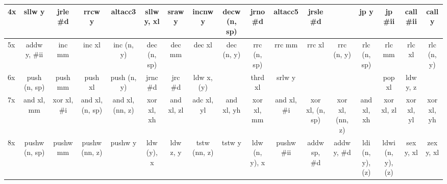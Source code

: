 \documentclass{book}
\begin{document}
\begin{table}
\begin{adjustbox}{width=1.2\textwidth}
\begin{tabular}{l||c|c|c|c|c|c|c|c|c|c|c|c|c|c|c|c}
\hline
4x & \cellcolor{Bisque1} sllw y & \cellcolor{DarkSeaGreen1} jrle \#d & \cellcolor{Bisque1} rrcw y & \cellcolor{DarkSeaGreen1} altacc3 & \cellcolor{Bisque1} sllw y, xl & \cellcolor{Bisque1} sraw y & \cellcolor{Bisque1} incnw y & \cellcolor{Bisque1} decw (n, sp) & \cellcolor{DarkSeaGreen1} jrno \#d & \cellcolor{DarkSeaGreen1} altacc5 & \cellcolor{DarkSeaGreen1} jrsle \#d & \cellcolor{white}  & \cellcolor{DarkSeaGreen1} jp y & \cellcolor{DarkSeaGreen1} jp \#ii & \cellcolor{DarkSeaGreen1} call \#ii & \cellcolor{DarkSeaGreen1} call y \\
\hline
5x & \cellcolor{Bisque1} addw y, \#ii & \cellcolor{DarkSeaGreen1} inc mm & \cellcolor{DarkSeaGreen1} inc xl & \cellcolor{Bisque1} inc (n, y) & \cellcolor{DarkSeaGreen1} dec (n, sp) & \cellcolor{DarkSeaGreen1} dec mm & \cellcolor{DarkSeaGreen1} dec xl & \cellcolor{Bisque1} dec (n, y) & \cellcolor{DarkSeaGreen1} rrc (n, sp) & \cellcolor{DarkSeaGreen1} rrc mm & \cellcolor{DarkSeaGreen1} rrc xl & \cellcolor{Bisque1} rrc (n, y) & \cellcolor{DarkSeaGreen1} rlc (n, sp) & \cellcolor{DarkSeaGreen1} rlc mm & \cellcolor{DarkSeaGreen1} rlc xl & \cellcolor{Bisque1} rlc (n, y) \\
\hline
6x & \cellcolor{DarkSeaGreen1} push (n, sp) & \cellcolor{DarkSeaGreen1} push mm & \cellcolor{DarkSeaGreen1} push xl & \cellcolor{Bisque1} push (n, y) & \cellcolor{DarkSeaGreen1} jrnc \#d & \cellcolor{DarkSeaGreen1} jrc \#d & \cellcolor{Bisque1} ldw x, (y) & \cellcolor{white}  & \cellcolor{DarkSeaGreen1} thrd xl & \cellcolor{Bisque1} srlw y & \cellcolor{white}  & \cellcolor{white}  & \cellcolor{white}  & \cellcolor{DarkSeaGreen1} pop xl & \cellcolor{DarkSeaGreen1} ldw y, z & \cellcolor{white}  \\
\hline
7x & \cellcolor{DarkSeaGreen1} and xl, mm & \cellcolor{DarkSeaGreen1} xor xl, \#i & \cellcolor{DarkSeaGreen1} and xl, (n, sp) & \cellcolor{DarkSeaGreen1} and xl, (nn, z) & \cellcolor{DarkSeaGreen1} xor xl, xh & \cellcolor{DarkSeaGreen1} and xl, zl & \cellcolor{DarkSeaGreen1} adc xl, yl & \cellcolor{DarkSeaGreen1} and xl, yh & \cellcolor{DarkSeaGreen1} xor xl, mm & \cellcolor{DarkSeaGreen1} and xl, \#i & \cellcolor{DarkSeaGreen1} xor xl, (n, sp) & \cellcolor{DarkSeaGreen1} xor xl, (nn, z) & \cellcolor{DarkSeaGreen1} and xl, xh & \cellcolor{DarkSeaGreen1} xor xl, zl & \cellcolor{DarkSeaGreen1} xor xl, yl & \cellcolor{DarkSeaGreen1} xor xl, yh \\
\hline
8x & \cellcolor{DarkSeaGreen1} pushw (n, sp) & \cellcolor{DarkSeaGreen1} pushw mm & \cellcolor{DarkSeaGreen1} pushw (nn, z) & \cellcolor{DarkSeaGreen1} pushw y & \cellcolor{DarkSeaGreen1} ldw (y), x & \cellcolor{DarkSeaGreen1} ldw z, y & \cellcolor{DarkSeaGreen1} tstw (nn, z) & \cellcolor{DarkSeaGreen1} tstw y & \cellcolor{Bisque1} ldw (n, y), x & \cellcolor{DarkSeaGreen1} pushw \#ii & \cellcolor{DarkSeaGreen1} addw sp, \#d & \cellcolor{DarkSeaGreen1} addw y, \#d & \cellcolor{Bisque1} ldi (n, y), (z) & \cellcolor{Bisque1} ldwi (n, y), (z) & \cellcolor{Bisque1} sex y, xl & \cellcolor{Bisque1} zex y, xl \\

\end{tabular}
\end{adjustbox}
\end{table}
\end{document}
